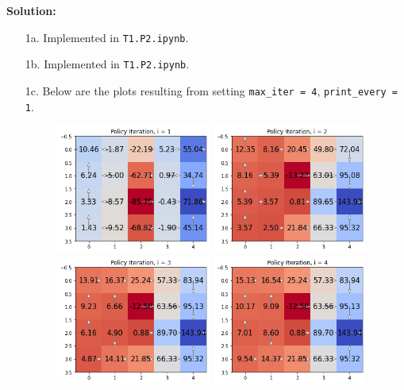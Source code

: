 \documentclass[submit]{harvardml}
\begin{document}
\newpage
\textbf{Solution:}
\begin{itemize}
    \item[1a.]
    Implemented in \texttt{T1.P2.ipynb}.

    \item[1b.]
    Implemented in \texttt{T1.P2.ipynb}.

    \item[1c.]
    Below are the plots resulting from setting \texttt{max\_iter = 4}, \texttt{print\_every = 1}.

    \begin{figure}[H]
        \centering
        {
            \includegraphics[width=0.48\textwidth]{hw6_1c_1}
            \includegraphics[width=0.48\textwidth]{hw6_1c_2}
        }\hfill
        {
            \includegraphics[width=0.48\textwidth]{hw6_1c_3}
            \includegraphics[width=0.48\textwidth]{hw6_1c_4}
        }
    \end{figure}


\end{itemize}
\end{document}
